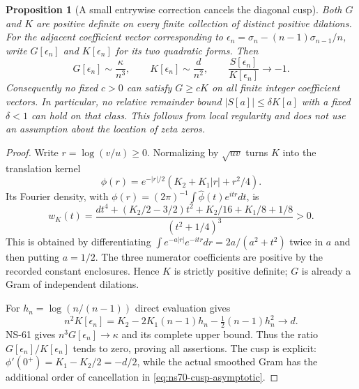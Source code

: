 \documentclass[11pt]{article}
\newtheorem{proposition}[theorem]{Proposition}
\theoremstyle{remark}
\begin{document}
\begin{proposition}[A small entrywise correction cancels the diagonal cusp]
\label{prop:ns70-cusp}
Both $G$ and $K$ are positive definite on every finite collection of
distinct positive dilations. For the adjacent coefficient vector
corresponding to
$\epsilon_n=\sigma_n-(n-1)\sigma_{n-1}/n$, write $G[\epsilon_n]$
and $K[\epsilon_n]$ for its two quadratic forms. Then
\begin{equation}
 G[\epsilon_n]\sim\frac\kappa{n^3},\qquad
 K[\epsilon_n]\sim\frac d{n^2},\qquad
 \frac{S[\epsilon_n]}{K[\epsilon_n]}\longrightarrow-1.
 \label{eq:ns70-cusp-asymptotic}
\end{equation}
Consequently no fixed $c>0$ can satisfy $G\geq cK$ on all finite
integer coefficient vectors. In particular, no relative remainder
bound $|S[a]|\leq\delta K[a]$ with a fixed $\delta<1$ can hold
on that class. This follows from local regularity and does not use
an assumption about the location of zeta zeros.
\end{proposition}
\begin{proof}
Write $r=\log(v/u)\geq0$. Normalizing by $\sqrt{uv}$ turns $K$
into the translation kernel
\[
 \phi(r)=e^{-|r|/2}(K_2+K_1|r|+r^2/4).
\]
Its Fourier density, with
$\phi(r)=(2\pi)^{-1}\int\widehat\phi(t)e^{itr}dt$, is
\begin{equation}
 w_K(t)=\frac{d t^4+(K_2/2-3/2)t^2
                         +K_2/16+K_1/8+1/8}{(t^2+1/4)^3}>0.
 \label{eq:ns70-background-symbol}
\end{equation}
This is obtained by differentiating
$\int e^{-a|r|}e^{-itr}dr=2a/(a^2+t^2)$ twice in $a$ and then
putting $a=1/2$. The three numerator coefficients are positive by
the recorded constant enclosures. Hence $K$ is strictly positive
definite; $G$ is already a Gram of independent dilations.

For $h_n=\log(n/(n-1))$ direct evaluation gives
\begin{equation}
 n^2K[\epsilon_n]
 =K_2-2K_1(n-1)h_n-\tfrac12(n-1)h_n^2\longrightarrow d.
 \label{eq:ns70-exact-adjacent-background}
\end{equation}
NS-61 gives $n^3G[\epsilon_n]\to\kappa$ and its complete upper
bound. Thus the ratio $G[\epsilon_n]/K[\epsilon_n]$ tends to zero,
proving all assertions. The cusp is explicit:
$\phi'(0^+)=K_1-K_2/2=-d/2$, while the actual smoothed Gram
has the additional order of cancellation in
\eqref{eq:ns70-cusp-asymptotic}.
\end{proof}
\end{document}
